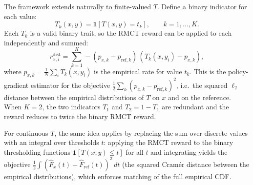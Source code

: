 \documentclass{article}
\begin{document}
The framework extends naturally to finite-valued $T$. Define a binary indicator for each value:
\begin{equation}
T_k(x, y) = \mathbf{1}[T(x, y) = t_k], \qquad k = 1, \ldots, K.
\end{equation}
Each $T_k$ is a valid binary trait, so the RMCT reward can be applied to each independently and summed:
\begin{equation}
r^{\text{dist}}_{x,i} = \sum_{k=1}^{K} -(p_{x,k} - p_{\text{ref},k})\,(T_k(x, y_i) - p_{x,k}),
\end{equation}
where $p_{x,k} = \frac{1}{N}\sum_i T_k(x, y_i)$ is the empirical rate for value $t_k$. This is the policy-gradient estimator for the objective $\frac{1}{2}\sum_k (p_{x,k} - p_{\text{ref},k})^2$, i.e.\ the squared $\ell_2$ distance between the empirical distributions of $T$ on $x$ and on the reference. When $K=2$, the two indicators $T_1$ and $T_2 = 1 - T_1$ are redundant and the reward reduces to twice the binary RMCT reward.

For continuous $T$, the same idea applies by replacing the sum over discrete values with an integral over thresholds $t$: applying the RMCT reward to the binary thresholding functions $\mathbf{1}[T(x, y) \leq t]$ for all $t$ and integrating yields the objective $\frac{1}{2}\int(\hat{F}_x(t) - \hat{F}_{\text{ref}}(t))^2\,dt$ (the squared Cram\'{e}r distance between the empirical distributions), which enforces matching of the full empirical CDF.

\fi
\end{document}
